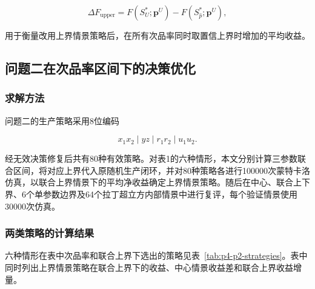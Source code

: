 \documentclass{cumcm}
\numberwithin{figure}{section}
\numberwithin{table}{section}
\begin{document}
\[
\Delta F_{\mathrm{upper}}=
F(S_U^*;\boldsymbol p^U)
-F(S_{\hat p}^*;\boldsymbol p^U),
\]

用于衡量改用上界情景策略后，在所有次品率同时取置信上界时增加的平均收益。

\subsection{问题二在次品率区间下的决策优化}\label{ux95eeux9898ux4e8cux5728ux6b21ux54c1ux7387ux533aux95f4ux4e0bux7684ux51b3ux7b56ux4f18ux5316}

\subsubsection{求解方法}\label{ux6c42ux89e3ux65b9ux6cd5}

问题二的生产策略采用8位编码

\[
x_1x_2\mid yz\mid r_1r_2\mid u_1u_2.
\]

经无效决策修复后共有80种有效策略。对表1的六种情形，本文分别计算三参数联合区间，将对应上界代入原随机生产闭环，并对80种策略各进行100000次蒙特卡洛仿真，以联合上界情景下的平均净收益确定上界情景策略。随后在中心、联合上下界、6个单参数边界及64个拉丁超立方内部情景中进行复评，每个验证情景使用30000次仿真。

\subsubsection{两类策略的计算结果}\label{ux4e24ux7c7bux7b56ux7565ux7684ux8ba1ux7b97ux7ed3ux679c}

六种情形在表中次品率和联合上界下选出的策略见表~\ref{tab:p4-p2-strategies}。表中同时列出上界情景策略在联合上界下的收益、中心情景收益差和联合上界收益增量。
\end{document}
